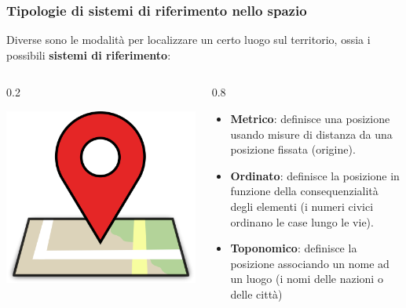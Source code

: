 \documentclass{beamer}
\begin{document}
{\begin{frame}
   \frametitle{Tipologie di sistemi di riferimento nello spazio}
   Diverse sono le modalità per localizzare un certo luogo sul territorio, ossia i possibili \textbf{sistemi di riferimento}:
   \begin{columns}	
      	\begin{column} {0.2\textwidth}
			\begin{center}
				\includegraphics[width=1\textwidth] {./pics/location_icon.png}	
			\end{center} 
		\end{column}
   		\begin{column} {0.8\textwidth}
		   \begin{itemize}
		   		\item \textbf{Metrico}: definisce una posizione usando misure di distanza da una posizione fissata (origine).
		   		\item \textbf{Ordinato}: definisce la posizione in funzione della consequenzialità degli elementi (i numeri civici ordinano le case lungo le vie).
		   		\item \textbf{Toponomico}: definisce la posizione associando un nome ad un luogo (i nomi delle nazioni o delle città) 
		   \end{itemize}
		\end{column}
	\end{columns}

\end{frame}

}
\end{document}
